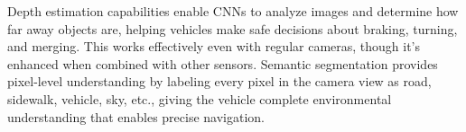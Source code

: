 Depth estimation capabilities enable CNNs to analyze images and determine how far away objects are, helping vehicles make safe decisions about braking, turning, and merging. This works effectively even with regular cameras, though it's enhanced when combined with other sensors. Semantic segmentation provides pixel-level understanding by labeling every pixel in the camera view as road, sidewalk, vehicle, sky, etc., giving the vehicle complete environmental understanding that enables precise navigation.

